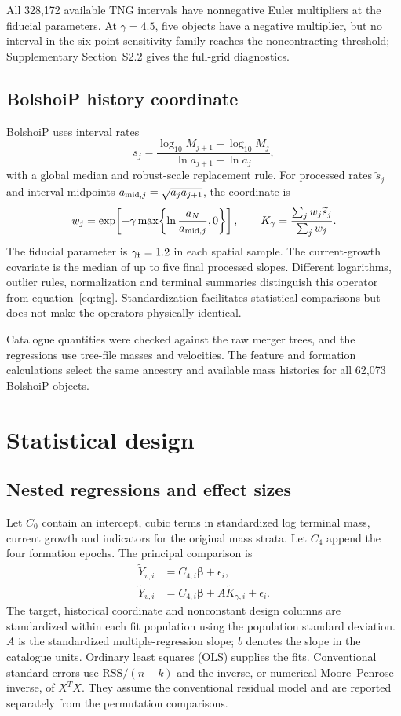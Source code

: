 \documentclass[11pt,a4paper]{article}
\begin{document}
All 328,172 available TNG intervals have nonnegative Euler multipliers at the fiducial parameters. At $\gamma=4.5$, five objects have a negative multiplier, but no interval in the six-point sensitivity family reaches the noncontracting threshold; Supplementary Section~S2.2 gives the full-grid diagnostics.

\subsection{BolshoiP history coordinate}
BolshoiP uses interval rates
\begin{equation}
s_j=\frac{\log_{10}M_{j+1}-\log_{10}M_j}{\ln a_{j+1}-\ln a_j},
\end{equation}
with a global median and robust-scale replacement rule. For processed rates $\widetilde s_j$ and interval midpoints $a_{{\rm mid},j}=\sqrt{a_ja_{j+1}}$, the coordinate is
\begin{equation}
w_j=\exp\!\left[-\gamma\max\!\left\{\ln\frac{a_N}{a_{{\rm mid},j}},0\right\}\right],\qquad K_\gamma=\frac{\sum_jw_j\widetilde s_j}{\sum_jw_j}.\label{eq:bp}
\end{equation}
The fiducial parameter is $\gamma_{\rm f}=1.2$ in each spatial sample. The current-growth covariate is the median of up to five final processed slopes. Different logarithms, outlier rules, normalization and terminal summaries distinguish this operator from equation~\eqref{eq:tng}. Standardization facilitates statistical comparisons but does not make the operators physically identical.

Catalogue quantities were checked against the raw merger trees, and the regressions use tree-file masses and velocities. The feature and formation calculations select the same ancestry and available mass histories for all 62,073 BolshoiP objects.

\section{Statistical design}
\subsection{Nested regressions and effect sizes}
Let $C_0$ contain an intercept, cubic terms in standardized log terminal mass, current growth and indicators for the original mass strata. Let $C_4$ append the four formation epochs. The principal comparison is
\begin{align}
\widetilde Y_{v,i}&=C_{4,i}\boldsymbol\beta+\epsilon_i,\label{eq:base}\\
\widetilde Y_{v,i}&=C_{4,i}\boldsymbol\beta+A\widetilde K_{\gamma,i}+\epsilon_i.\label{eq:full}
\end{align}
The target, historical coordinate and nonconstant design columns are standardized within each fit population using the population standard deviation. $A$ is the standardized multiple-regression slope; $b$ denotes the slope in the catalogue units. Ordinary least squares (OLS) supplies the fits. Conventional standard errors use $\mathrm{RSS}/(n-k)$ and the inverse, or numerical Moore--Penrose inverse, of $X^TX$. They assume the conventional residual model and are reported separately from the permutation comparisons.
\end{document}
